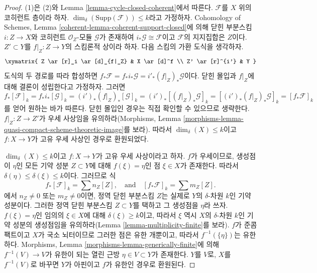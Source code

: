 \begin{proof}
(1)은 (2)와 Lemma \ref{lemma-cycle-closed-coherent}에서 따른다.
$\mathcal{F}$를 $X$ 위의 코히런트 층이라 하자.
$\dim_\delta(\text{Supp}(\mathcal{F})) \leq k$라고 가정하자.
Cohomology of Schemes, Lemma \ref{coherent-lemma-coherent-support-closed}에
의해 닫힌 부분스킴 $i : Z \to X$와 코히런트
$\mathcal{O}_Z$-모듈 $\mathcal{G}$가 존재하여
$i_*\mathcal{G} \cong \mathcal{F}$이고 $\mathcal{F}$의 지지집합은 $Z$이다.
$Z' \subset Y$를 $f|_Z : Z \to Y$의 스킴론적 상이라 하자. 다음 스킴의
가환 도식을 생각하자.
$$
\xymatrix{
Z \ar[r]_i \ar[d]_{f|_Z} &
X \ar[d]^f \\
Z' \ar[r]^{i'} & Y
}
$$
도식의 두 경로를 따라 합성하면
$f_*\mathcal{F} = f_*i_*\mathcal{G} = i'_*(f|_Z)_*\mathcal{G}$이다.
닫힌 몰입과 $f|_Z$에 대해 결론이 성립한다고 가정하자. 그러면
$$
f_*[\mathcal{F}]_k = f_*i_*[\mathcal{G}]_k
= (i')_*(f|_Z)_*[\mathcal{G}]_k =
(i')_*[(f|_Z)_*\mathcal{G}]_k =
[(i')_*(f|_Z)_*\mathcal{G}]_k = [f_*\mathcal{F}]_k
$$
를 얻어 원하는 바가 따른다. 닫힌 몰입인 경우는 직접 확인할 수 있으므로
생략한다. $f|_Z : Z \to Z'$가 우세 사상임을 유의하라(Morphisms, Lemma
\ref{morphisms-lemma-quasi-compact-scheme-theoretic-image}를 보라).
따라서 $\dim_\delta(X) \leq k$이고 $f : X \to Y$가 고유 우세 사상인
경우로 환원되었다.

\medskip\noindent
$\dim_\delta(X) \leq k$이고 $f : X \to Y$가 고유 우세 사상이라고 하자.
$f$가 우세이므로, 생성점이 $\eta$인 모든 기약 성분
$Z \subset Y$에 대해 $f(\xi) = \eta$인 점 $\xi \in X$가 존재한다.
따라서 $\delta(\eta) \leq \delta(\xi) \leq k$이다. 그러므로 식
$$
f_*[\mathcal{F}]_k = \sum n_Z[Z],
\quad
\text{and}
\quad
[f_*\mathcal{F}]_k = \sum m_Z[Z].
$$
에서 $n_Z \not = 0$ 또는 $m_Z \not = 0$이면, 정역 닫힌 부분스킴
$Z$는 실제로 $Y$의 $\delta$-차원 $k$인 기약 성분이다. 그러한 정역
닫힌 부분스킴 $Z \subset Y$를 택하고 그 생성점을 $\eta$라 쓰자.
$f(\xi) = \eta$인 임의의 $\xi \in X$에 대해
$\delta(\xi) \geq k$이고, 따라서 $\xi$ 역시 $X$의 $\delta$-차원
$k$인 기약 성분의 생성점임을 유의하라(Lemma
\ref{lemma-multiplicity-finite}를 보라). $f$가 준콤팩트이고 $X$가
국소 뇌터이므로 그러한 점은 유한 개뿐이고, 따라서
$f^{-1}(\{\eta\})$는 유한하다. Morphisms, Lemma
\ref{morphisms-lemma-generically-finite}에 의해 $f^{-1}(V) \to V$가
유한이 되는 열린 근방 $\eta \in V \subset Y$가 존재한다. $Y$를 $V$로,
$X$를 $f^{-1}(V)$로 바꾸면 $Y$가 아핀이고 $f$가 유한인 경우로
환원된다.


\end{proof}

